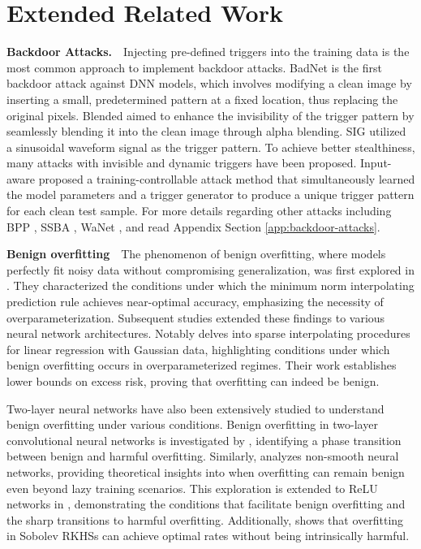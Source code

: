         
        



\section{Extended Related Work}
\label{ext_rel}

\textbf{Backdoor Attacks.}\ \ Injecting pre-defined triggers into the training data is the most common approach to implement backdoor attacks. BadNet \cite{badnets} is the first backdoor attack against DNN models, which involves modifying a clean image by inserting a small, predetermined pattern at a fixed location, thus replacing the original pixels. Blended \cite{blended} aimed to enhance the invisibility of the trigger pattern by seamlessly blending it into the clean image through alpha blending. SIG \cite{sig} utilized a sinusoidal waveform signal as the trigger pattern. To achieve better stealthiness, many attacks with invisible and dynamic triggers have been proposed. Input-aware \cite{inputaware} proposed a training-controllable attack method that simultaneously learned the model parameters and a trigger generator to produce a unique trigger pattern for each clean test sample. For more details regarding other attacks including BPP \cite{bpp}, SSBA \cite{ssba}, WaNet \cite{wanet}, and \cite{color} read Appendix Section \ref{app:backdoor-attacks}.


\textbf{Benign overfitting}\ \  
The phenomenon of benign overfitting, where models perfectly fit noisy data without compromising generalization, was first explored in \cite{tsigler2020benign}. They characterized the conditions under which the minimum norm interpolating prediction rule achieves near-optimal accuracy, emphasizing the necessity of overparameterization. Subsequent studies extended these findings to various neural network architectures. Notably \cite{chatterji2022foolish} delves into sparse interpolating procedures for linear regression with Gaussian data, highlighting conditions under which benign overfitting occurs in overparameterized regimes. Their work establishes lower bounds on excess risk, proving that overfitting can indeed be benign. 

Two-layer neural networks have also been extensively studied to understand benign overfitting under various conditions. Benign overfitting in two-layer convolutional neural networks is investigated by \cite{cao2022benign}, identifying a phase transition between benign and harmful overfitting. Similarly, \cite{xu2023benign} analyzes non-smooth neural networks, providing theoretical insights into when overfitting can remain benign even beyond lazy training scenarios. This exploration is extended to ReLU networks in \cite{kou2023benign}, demonstrating the conditions that facilitate benign overfitting and the sharp transitions to harmful overfitting. Additionally, \cite{haas2024mind} shows that overfitting in Sobolev RKHSs can achieve optimal rates without being intrinsically harmful. 

